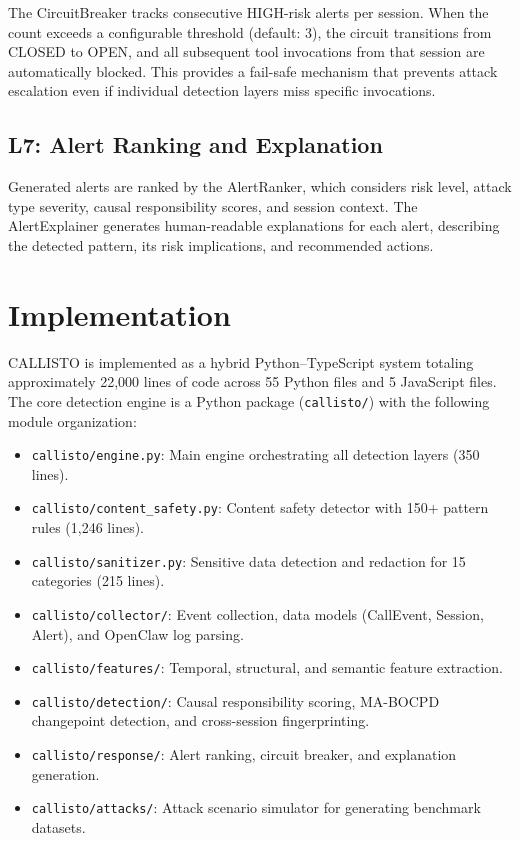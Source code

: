\documentclass[10pt,conference]{IEEEtran}
\begin{document}
The CircuitBreaker tracks consecutive HIGH-risk alerts per session. When the count exceeds a configurable threshold (default: 3), the circuit transitions from CLOSED to OPEN, and all subsequent tool invocations from that session are automatically blocked. This provides a fail-safe mechanism that prevents attack escalation even if individual detection layers miss specific invocations.

\subsection{L7: Alert Ranking and Explanation}

Generated alerts are ranked by the AlertRanker, which considers risk level, attack type severity, causal responsibility scores, and session context. The AlertExplainer generates human-readable explanations for each alert, describing the detected pattern, its risk implications, and recommended actions.

\section{Implementation}

CALLISTO is implemented as a hybrid Python–TypeScript system totaling approximately 22,000 lines of code across 55 Python files and 5 JavaScript files. The core detection engine is a Python package (\texttt{callisto/}) with the following module organization:

\begin{itemize}
    \item \texttt{callisto/engine.py}: Main engine orchestrating all detection layers (350 lines).
    \item \texttt{callisto/content\_safety.py}: Content safety detector with 150+ pattern rules (1,246 lines).
    \item \texttt{callisto/sanitizer.py}: Sensitive data detection and redaction for 15 categories (215 lines).
    \item \texttt{callisto/collector/}: Event collection, data models (CallEvent, Session, Alert), and OpenClaw log parsing.
    \item \texttt{callisto/features/}: Temporal, structural, and semantic feature extraction.
    \item \texttt{callisto/detection/}: Causal responsibility scoring, MA-BOCPD changepoint detection, and cross-session fingerprinting.
    \item \texttt{callisto/response/}: Alert ranking, circuit breaker, and explanation generation.
    \item \texttt{callisto/attacks/}: Attack scenario simulator for generating benchmark datasets.
\end{itemize}
\end{document}
